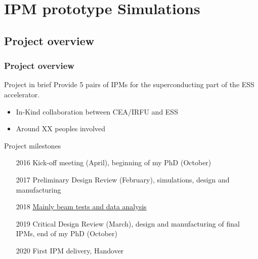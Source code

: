 \section{IPM prototype Simulations}
\subsection{Project overview}
\begin{frame}
  \frametitle{Project overview}
  \begin{block}{Project in brief}
    Provide 5 pairs of IPMs for the superconducting part of the ESS accelerator.
    \begin{itemize}
      \item In-Kind collaboration between CEA/IRFU and ESS
      \item Around XX peoples involved
    \end{itemize}
  \end{block}
  \begin{block}{Project milestones}
    \begin{itemize}
      \item[2016] Kick-off meeting (April), beginning of my PhD (October)
      \item[2017] Preliminary Design Review (February), simulations, design and manufacturing
      \item[2018] \underline{Mainly beam tests and data analysis}
      \item[2019] Critical Design Review (March), design and manufacturing of final IPMs, end of my PhD (October)
      \item[2020] First IPM delivery, Handover
    \end{itemize}
  \end{block}
\end{frame}

